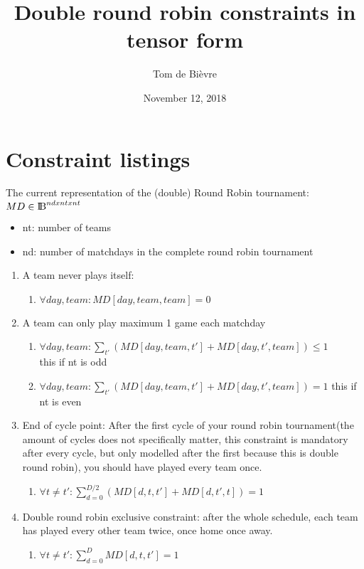 \documentclass[titlepage]{article}%
\title{Double round robin constraints in tensor form}
\date{November 12, 2018}
\author{Tom de Bièvre}
\begin{document}
\maketitle
\section*{Constraint listings}
The current representation of the (double) Round Robin tournament: ${MD \in \rm I\!B}^{nd x nt x nt}$

\begin{itemize}  
	\item nt: number of teams
	\item nd: number of matchdays in the complete round robin tournament
\end{itemize}

\begin{enumerate}
 \item A team never plays itself: 
 \begin{enumerate}
 \item $\forall day,team : MD[day,team,team] = 0$
 \end{enumerate}
 
 \item A team can only play maximum 1 game each matchday
 \begin{enumerate}
 \item $\forall day,team : \sum\nolimits_{t'} ( MD[day,team,t'] + MD[day, t',team]) \leq 1$ \\
 this if nt is odd
 \item $\forall day,team : \sum\nolimits_{t'} ( MD[day,team,t'] + MD[day, t',team]) = 1 $ 
 this if nt is even 
 \end{enumerate}
 
 \item End of cycle point: After the first cycle of your round robin tournament(the amount of cycles does not specifically matter, this constraint is mandatory after every cycle, but only modelled after the first because this is double round robin), you should have played every team once.
 
 \begin{enumerate}
 \item $\forall t \neq t': \sum\limits_{d=0}^{D/2} (MD[d,t,t'] + MD[d,t',t]) = 1$
 \end{enumerate}
 
 \item Double round robin exclusive constraint: after the whole schedule, each team has played every other team twice, once home once away. 
 \begin{enumerate}
 \item $\forall t \neq t': \sum\limits_{d=0}^{D} MD[d,t,t'] = 1$
 \end{enumerate}


\end{enumerate}
\end{document}
